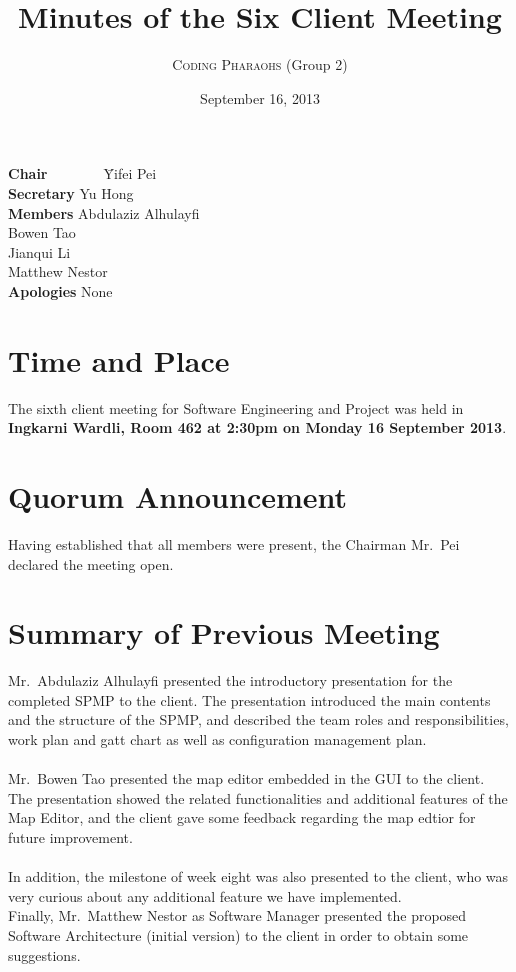 \documentclass[12pt, a4paper]{article}
\title{Minutes of the Six Client Meeting}
\author{\textsc{Coding Pharaohs} (Group 2)}
\date{September 16, 2013}
\begin{document}
\maketitle
\begin{tabbing}
\textbf{Chair}~~~~~~~~\=Yifei Pei           \\
\textbf{Secretary}    \>Yu Hong      \\
\textbf{Members}      \>Abdulaziz Alhulayfi \\
                      \>Bowen Tao           \\
                      \>Jianqui Li          \\
                      \>Matthew Nestor      \\
\textbf{Apologies}    \>None                \\
\end{tabbing}
\section{Time and Place}
The sixth client meeting for Software Engineering and Project was held in \textbf{Ingkarni
Wardli, Room 462 \textnormal{at} 2:30pm \textnormal{on} Monday 16 September 2013}.
\section{Quorum Announcement}
Having established that all members were present, the Chairman Mr.~Pei declared the meeting open.

\section{Summary of Previous Meeting}

Mr.~Abdulaziz Alhulayfi presented the introductory presentation for the completed SPMP to the client. The presentation introduced the main contents and the structure of the SPMP, and described the team roles and responsibilities, work plan and gatt chart as well as configuration management plan. \\
\\
Mr.~Bowen Tao presented the map editor embedded in the GUI to the client. The presentation showed the related functionalities and additional features of the Map Editor, and the client gave some feedback regarding the map edtior for future improvement.\\
\\
In addition, the milestone of week eight was also presented to the client, who was very curious about any additional feature we have implemented. 
\\
Finally, Mr.~Matthew Nestor as Software Manager presented the proposed Software Architecture (initial version) to the client in order to obtain some suggestions.
\end{document}
